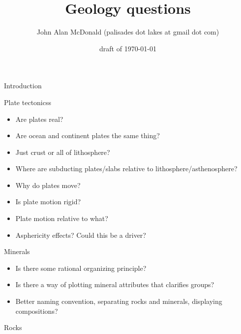 \documentclass[12pt]{PalisadesLakesBook}
\title{Geology questions}
\author{John Alan McDonald 
(palisades dot lakes at gmail dot com)}
\date{draft of \today}
\begin{document}
\maketitle
{}
\begin{plSection}{Introduction} 
\end{plSection}%
\begin{plSection}{Plate tectonicss}
  \begin{itemize}
    \item Are plates real?
    \item Are ocean and continent plates the same thing?
    \item Just crust or all of lithosphere?
    \item Where are subducting plates/slabs relative to lithosphere/asthenosphere?
    \item Why do plates move?
    \item Is plate motion rigid?
    \item Plate motion relative to what?
    \item Asphericity effects? Could this be a driver?
  \end{itemize}
\end{plSection}%
\begin{plSection}{Minerals}
  \begin{itemize}
    \item Is there some rational organizing principle?
    \item Is there a way of plotting mineral attributes that clarifies groups?
    \item Better naming convention, separating rocks and minerals, displaying compositions?
  \end{itemize}

\end{plSection}%
\begin{plSection}{Rocks}
\end{plSection}%
%
\end{document}
